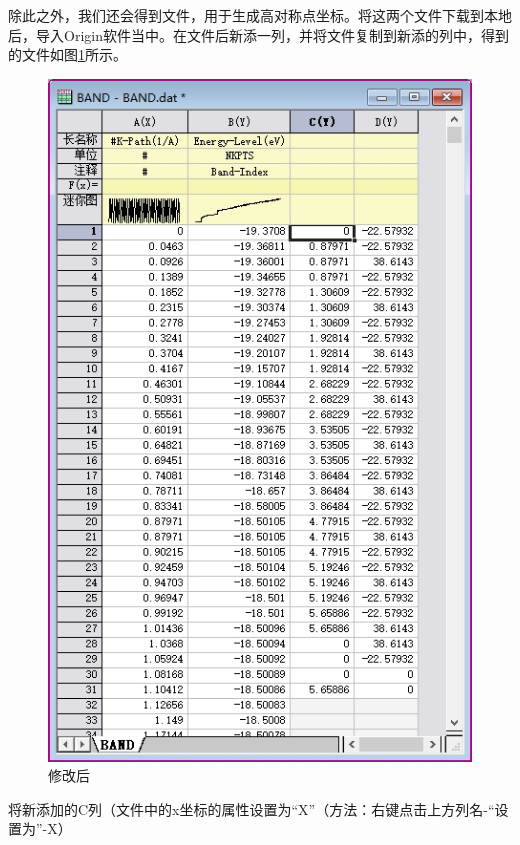 除此之外，我们还会得到文件，用于生成高对称点坐标。将这两个文件下载到本地后，导入Origin软件当中。在文件后新添一列，并将文件复制到新添的列中，得到的文件如图\ref{fig:能带绘图与后处理-BAND.dat修改后}所示。

\begin{figure}
    \centering
    \includegraphics[width=1\linewidth]{VASP计算/能带计算/能带绘图与后处理/fig/BAND_dat.png}
    \caption{修改后}
    \label{fig:能带绘图与后处理-BAND.dat修改后}
\end{figure}

将新添加的C列（文件中的x坐标的属性设置为“X”（方法：右键点击上方列名-“设置为”-X）

